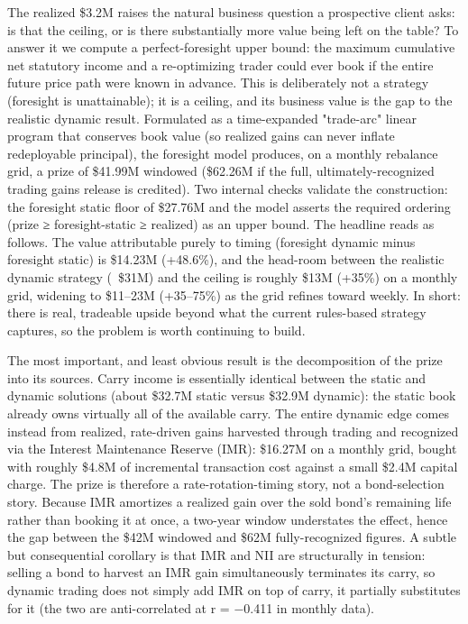 \documentclass[12pt]{article}
\begin{document}
The realized \$3.2M raises the natural business question a prospective client asks: is that the ceiling, or is there substantially more value being left on the table? To answer it we compute a perfect-foresight upper bound: the maximum cumulative net statutory income and a re-optimizing trader could ever book if the entire future price path were known in advance. This is deliberately not a strategy (foresight is unattainable); it is a ceiling, and its business value is the gap to the realistic dynamic result. Formulated as a time-expanded "trade-arc" linear program that conserves book value (so realized gains can never inflate redeployable principal), the foresight model produces, on a monthly rebalance grid, a prize of \$41.99M windowed (\$62.26M if the full, ultimately-recognized trading gains release is credited). Two internal checks validate the construction: the foresight static floor of \$27.76M and the model asserts the required ordering (prize ≥ foresight-static ≥ realized) as an upper bound. The headline reads as follows. The value attributable purely to timing (foresight dynamic minus foresight static) is \$14.23M (+48.6\%), and the head-room between the realistic dynamic strategy (~\$31M) and the ceiling is roughly \$13M (+35\%) on a monthly grid, widening to \$11–23M (+35–75\%) as the grid refines toward weekly. In short: there is real, tradeable upside beyond what the current rules-based strategy captures, so the problem is worth continuing to build.

The most important, and least obvious result is the decomposition of the prize into its sources. Carry income is essentially identical between the static and dynamic solutions (about \$32.7M static versus \$32.9M dynamic): the static book already owns virtually all of the available carry. The entire dynamic edge comes instead from realized, rate-driven gains harvested through trading and recognized via the Interest Maintenance Reserve (IMR): \+\$16.27M on a monthly grid, bought with roughly \$4.8M of incremental transaction cost against a small \$2.4M capital charge. The prize is therefore a rate-rotation-timing story, not a bond-selection story. Because IMR amortizes a realized gain over the sold bond's remaining life rather than booking it at once, a two-year window understates the effect, hence the gap between the \$42M windowed and \$62M fully-recognized figures. A subtle but consequential corollary is that IMR and NII are structurally in tension: selling a bond to harvest an IMR gain simultaneously terminates its carry, so dynamic trading does not simply add IMR on top of carry, it partially substitutes for it (the two are anti-correlated at r = −0.411 in monthly data).
\end{document}

